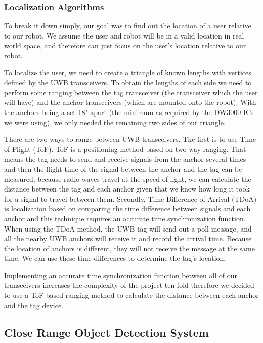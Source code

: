 \documentclass{report}
\begin{document}
    \subsubsection{Localization Algorithms} 
    To break it down simply, our goal was to find out the location of a user relative to our robot. We assume the user and robot will be in a valid location in real world space, and therefore can just focus on the user's location relative to our robot.

    To localize the user, we need to create a triangle of known lengths with vertices defined by the UWB transceivers. To obtain the lengths of each side we need to perform some ranging between the tag transceiver (the transceiver which the user will have) and the anchor transceivers (which are mounted onto the robot). With the anchors being a set 18" apart (the minimum as required by the DW3000 ICs we were using), we only needed the remaining two sides of our triangle.

    There are two ways to range between UWB transceivers. The first is to use Time of Flight (ToF). ToF is a positioning method based on two-way ranging. That means the tag needs to send and receive signals from the anchor several times and then the flight time of the signal between the anchor and the tag can be measured, because radio waves travel at the speed of light, we can calculate the distance between the tag and each anchor given that we know how long it took for a signal to travel between them. Secondly, Time Difference of Arrival (TDoA) is localization based on comparing the time difference between signals and each anchor and this technique requires an accurate time synchronization function. When using the TDoA method, the UWB tag will send out a poll message, and all the nearby UWB anchors will receive it and record the arrival time. Because the location of anchors is different, they will not receive the message at the same time. We can use these time differences to determine the tag’s location.

    Implementing an accurate time synchronization function between all of our transceivers increases the complexity of the project ten-fold therefore we decided to use a ToF based ranging method to calculate the distance between each anchor and the tag device.
    
    \subsection{Close Range Object Detection System}
\end{document}
